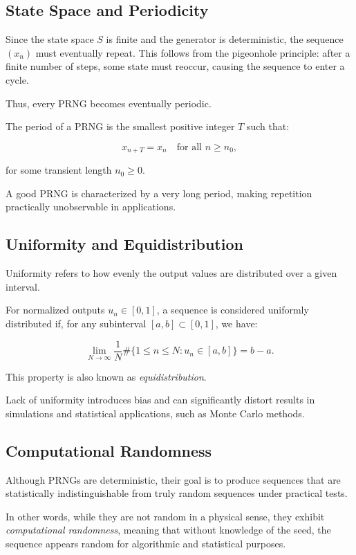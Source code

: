 \subsection{State Space and Periodicity}

Since the state space $S$ is finite and the generator is deterministic, the sequence $(x_n)$ must eventually repeat. This follows from the pigeonhole principle: after a finite number of steps, some state must reoccur, causing the sequence to enter a cycle.

Thus, every PRNG becomes eventually periodic.

The period of a PRNG is the smallest positive integer $T$ such that:

$$
x_{n+T} = x_n \quad \text{for all } n \ge n_0,
$$

for some transient length $n_0 \ge 0$.

A good PRNG is characterized by a very long period, making repetition practically unobservable in applications.

\subsection{Uniformity and Equidistribution}

Uniformity refers to how evenly the output values are distributed over a given interval.

For normalized outputs $u_n \in [0,1]$, a sequence is considered uniformly distributed if, for any subinterval $[a,b] \subset [0,1]$, we have:

$$
\lim_{N \to \infty}
\frac{1}{N} \#\{1 \le n \le N : u_n \in [a,b]\}
= b - a.
$$

This property is also known as \textit{equidistribution}.

Lack of uniformity introduces bias and can significantly distort results in simulations and statistical applications, such as Monte Carlo methods.

\subsection{Computational Randomness}

Although PRNGs are deterministic, their goal is to produce sequences that are statistically indistinguishable from truly random sequences under practical tests.

In other words, while they are not random in a physical sense, they exhibit \textit{computational randomness}, meaning that without knowledge of the seed, the sequence appears random for algorithmic and statistical purposes.

